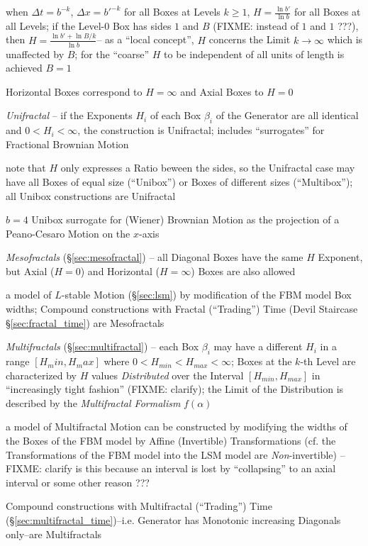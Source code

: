 when $\Delta t = b^{-k}$, $\Delta x = b'^{-k}$ for all Boxes at Levels
$k \geq 1$, $H = \frac{\ln b'}{\ln b}$ for all Boxes at all Levels; if the
Level-0 Box has sides $1$ and $B$ (FIXME: instead of $1$ and $1$ ???),
then $H = \frac{\ln b' + \ln B/k}{\ln b}$-- as a ``local concept'', $H$ concerns
the Limit $k \to \infty$ which is unaffected by $B$; for the ``coarse'' $H$ to
be independent of all units of length is achieved $B = 1$

Horizontal Boxes correspond to $H = \infty$ and Axial Boxes to $H = 0$

\emph{Unifractal} -- if the Exponents $H_i$ of each Box $\beta_i$ of the
Generator are all identical and $0 < H_i < \infty$, the construction is
Unifractal; includes ``surrogates'' for Fractional Brownian Motion

note that $H$ only expresses a Ratio beween the sides, so the Unifractal case
may have all Boxes of equal size (``Unibox'') or Boxes of different sizes
(``Multibox''); all Unibox constructions are Unifractal

$b = 4$ Unibox surrogate for (Wiener) Brownian Motion as the projection of a
Peano-Cesaro Motion on the $x$-axis

\emph{Mesofractals} (\S\ref{sec:mesofractal}) -- all Diagonal Boxes have the
same $H$ Exponent, but Axial ($H = 0$) and Horizontal ($H = \infty$) Boxes are
also allowed

a model of $L$-stable Motion (\S\ref{sec:lsm}) by modification of the FBM model
Box widths; Compound constructions with Fractal (``Trading'') Time (Devil
Staircase \S\ref{sec:fractal_time}) are Mesofractals

\emph{Multifractals} (\S\ref{sec:multifractal}) -- each Box $\beta_i$ may have a
different $H_i$ in a range $[H_min, H_max]$ where
$0 < H_{min} < H_{max} < \infty$; Boxes at the $k$-th Level are characterized by
$H$ values \emph{Distributed} over the Interval $[H_{min}, H_{max}]$ in
``increasingly tight fashion'' (FIXME: clarify); the Limit of the Distribution
is described by the \emph{Multifractal Formalism} $f(\alpha)$

a model of Multifractal Motion can be constructed by modifying the widths of the
Boxes of the FBM model by Affine (Invertible) Transformations (cf. the
Transformations of the FBM model into the LSM model are \emph{Non}-invertible)
--FIXME: clarify is this because an interval is lost by ``collapsing'' to an
axial interval or some other reason ???

Compound constructions with Multifractal (``Trading'') Time
(\S\ref{sec:multifractal_time})--i.e. Generator has Monotonic increasing
Diagonals only--are Multifractals

